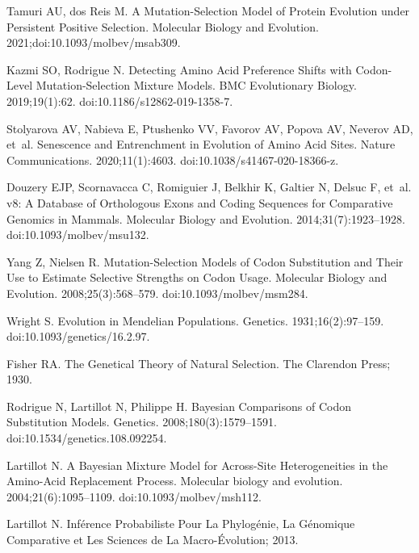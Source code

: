 \documentclass[10pt,letterpaper]{article}
\begin{document}
\begin{thebibliography}{10}
Tamuri AU, {dos Reis} M.
\newblock A Mutation-Selection Model of Protein Evolution under Persistent
Positive Selection.
\newblock Molecular Biology and Evolution. 2021;doi:{10.1093/molbev/msab309}.

Kazmi SO, Rodrigue N.
\newblock Detecting Amino Acid Preference Shifts with Codon-Level
Mutation-Selection Mixture Models.
\newblock BMC Evolutionary Biology. 2019;19(1):62.
\newblock doi:{10.1186/s12862-019-1358-7}.

Stolyarova AV, Nabieva E, Ptushenko VV, Favorov AV, Popova AV, Neverov AD,
et~al.
\newblock Senescence and Entrenchment in Evolution of Amino Acid Sites.
\newblock Nature Communications. 2020;11(1):4603.
\newblock doi:{10.1038/s41467-020-18366-z}.

Douzery EJP, Scornavacca C, Romiguier J, Belkhir K, Galtier N, Delsuc F, et~al.
 v8: {{A}} Database of Orthologous Exons and Coding
Sequences for Comparative Genomics in Mammals.
\newblock Molecular Biology and Evolution. 2014;31(7):1923--1928.
\newblock doi:{10.1093/molbev/msu132}.

Yang Z, Nielsen R.
\newblock Mutation-Selection Models of Codon Substitution and Their Use to
Estimate Selective Strengths on Codon Usage.
\newblock Molecular Biology and Evolution. 2008;25(3):568--579.
\newblock doi:{10.1093/molbev/msm284}.

Wright S.
\newblock Evolution in {{Mendelian}} Populations.
\newblock Genetics. 1931;16(2):97--159.
\newblock doi:{10.1093/genetics/16.2.97}.

Fisher RA.
\newblock The {{Genetical Theory}} of {{Natural Selection}}.
\newblock The Clarendon Press; 1930.

Rodrigue N, Lartillot N, Philippe H.
\newblock Bayesian Comparisons of Codon Substitution Models.
\newblock Genetics. 2008;180(3):1579--1591.
\newblock doi:{10.1534/genetics.108.092254}.

Lartillot N.
\newblock A Bayesian Mixture Model for Across-Site Heterogeneities in the
Amino-Acid Replacement Process.
\newblock Molecular biology and evolution. 2004;21(6):1095--1109.
\newblock doi:{10.1093/molbev/msh112}.

Lartillot N.
\newblock Inf{\'e}rence Probabiliste Pour La Phylog{\'e}nie, La G{\'e}nomique
Comparative et Les Sciences de La Macro-{\'E}volution; 2013.


\end{thebibliography}
\end{document}
